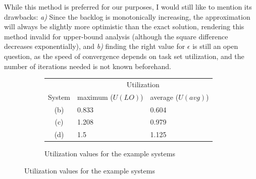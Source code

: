\documentclass[a4paper,oneside]{csthesis}
\begin{document}
While this method is preferred for our purposes, I would still like to mention its drawbacks: \textit{a)} Since the backlog is monotonically increasing, the approximation will always be slightly more optimistic than the exact solution, rendering this method invalid for upper-bound analysis (although the square difference decreases exponentially), and \textit{b)} finding the right value for $\epsilon$ is still an open question, as the speed of convergence depends on task set utilization, and the number of iterations needed is not known beforehand.

\begin{figure}[p]
\centering
    \begin{subfigure}[c]{\textwidth}
        \centering
        \begin{tabular}{@{}c|ll@{}}
            \toprule
            & \multicolumn{2}{c}{Utilization} \\
            System & maximum ($U(LO)$) & average ($U(avg)$) \\ 
            \midrule
            (b) & 0.833 & 0.604 \\
            (c) & 1.208 & 0.979 \\
            (d) & 1.5 & 1.125
        \end{tabular}
        \caption{Utilization values for the example systems}\label{subfig:backlogs-systems}
    \end{subfigure}
    

\end{figure}
\end{document}
